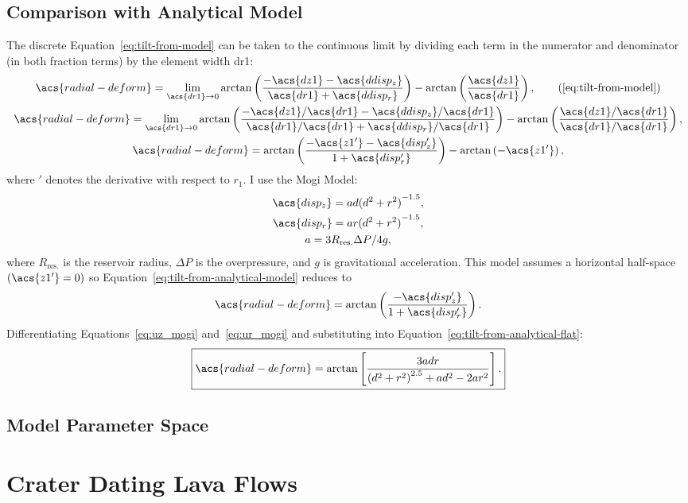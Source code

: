 \subsection{Comparison with Analytical Model}
The discrete Equation~\eqref{eq:tilt-from-model} can be taken to the continuous limit by dividing each term in the numerator and denominator (in both fraction terms) by the element width \acs{dr1}:
\begin{gather}
    \acs{radial-deform} = 
    \lim_{\acs{dr1}\to0} \arctan\left(\dfrac{-\acs{dz1}-\acs{ddisp_z}}{\acs{dr1}+\acs{ddisp_r}}\right) - \arctan\left(\frac{\acs{dz1}}{\acs{dr1}}\right),\tag{\ref{eq:tilt-from-model}}\\
    \acs{radial-deform} = 
    \lim_{\acs{dr1}\to0} \arctan\left(\dfrac{-\acs{dz1}/\acs{dr1}-\acs{ddisp_z}/\acs{dr1}}{\acs{dr1}/\acs{dr1}+\acs{ddisp_r}/\acs{dr1}}\right) - \arctan\left(\frac{\acs{dz1}/\acs{dr1}}{\acs{dr1}/\acs{dr1}}\right),\nonumber\\
    \acs{radial-deform} =
        \arctan\left(\dfrac{-\acs{z1'}-\acs{disp_z'}}{1+\acs{disp_r'}}\right) - \arctan\left(-\acs{z1'}\right),\label{eq:tilt-from-analytical-model}
\end{gather}
where $'$ denotes the derivative with respect to $r_1$. I use the Mogi Model:
\begin{gather}
    \acs{disp_z} = ad{(d^2+r^2)}^{-1.5},\label{eq:uz_mogi}\\
    \acs{disp_r} = ar{(d^2+r^2)}^{-1.5},\label{eq:ur_mogi}\\
    a = {3R_\text{res.}\Delta P}/{4g},\nonumber
\end{gather}
where $R_\text{res.}$ is the reservoir radius, $\Delta P$ is the overpressure, and $g$ is gravitational acceleration. This model assumes a horizontal half-space $(\acs{z1'}=0)$ so Equation~\eqref{eq:tilt-from-analytical-model} reduces to
\begin{equation}
    \acs{radial-deform} =
        \arctan\left(\dfrac{-\acs{disp_z'}}{1+\acs{disp_r'}}\right).\label{eq:tilt-from-analytical-flat}
\end{equation}
Differentiating Equations~\eqref{eq:uz_mogi} and~\eqref{eq:ur_mogi} and substituting into Equation~\eqref{eq:tilt-from-analytical-flat}:
\begin{equation}
    \boxed{\acs{radial-deform} = \arctan\left[\frac{3adr}{{(d^2+r^2)}^{2.5}+ad^2-2ar^2}\right].}\label{eq:tilt-from-mogi-model}
\end{equation}

\subsection{Model Parameter Space}

\section{Crater Dating Lava Flows}
